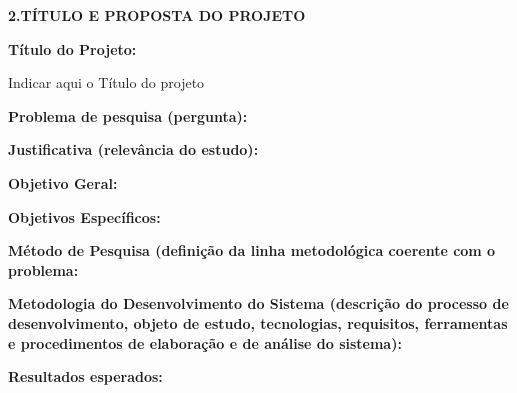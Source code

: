 \documentclass[
	hidelinks,
	12pt,				%
	openright,			%
	oneside,			%
	a4paper,			%
	english,			%
	french,				%
	spanish,			%
	brazil,				%
]{abntex2}
\begin{document}
\begin{flushleft}
   \normalsize\textbf{2.TÍTULO E PROPOSTA DO PROJETO}
\end{flushleft}

\begin{flushleft}
   \small \textbf{Título do Projeto:}
\end{flushleft} 
\normalsize
Indicar aqui o Título do projeto\\

\begin{flushleft}
\textbf{Problema de pesquisa (pergunta):}
\end{flushleft} 


\begin{flushleft}
\textbf{Justificativa (relevância do estudo):}
\end{flushleft} 


\begin{flushleft}
\textbf{Objetivo Geral:}
\end{flushleft} 



\begin{flushleft}
\textbf{Objetivos Específicos:}
\end{flushleft} 


\begin{justify}
\textbf{Método de Pesquisa (definição da linha metodológica coerente com o problema:}
\end{justify} 


\begin{justify}
\textbf{Metodologia do Desenvolvimento do Sistema (descrição do processo de desenvolvimento, objeto de estudo, tecnologias, requisitos, ferramentas e procedimentos de elaboração e de análise do sistema):}
\end{justify} 


\begin{flushleft}
\textbf{Resultados esperados:}
\end{flushleft} 

\end{document}
